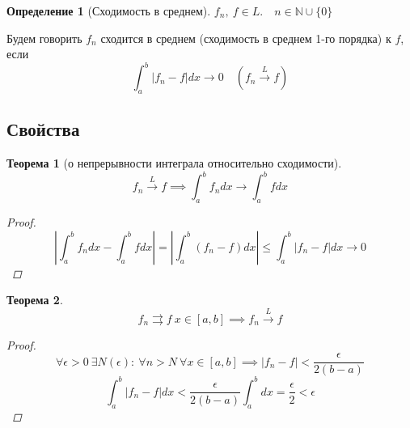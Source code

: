 \documentclass[a4paper]{article}
\newtheorem*{theorem}{Теорема}
\theoremstyle{definition}
\newtheorem*{definition}{Определение}
\theoremstyle{remark}
\begin{document}
\begin{tcolorbox}[title=Сходимость в среднем]
    \begin{definition}[Сходимость в среднем]
        $ f_n, \ f \in L. \quad n \in \mathbb{N} \cup \{ 0 \} $ 

        Будем говорить $ f_n $ сходится в среднем (сходимость в среднем 1-го порядка)
        к $ f $, если
        \[
            \int_{a}^{b} |f_n - f| dx \to 0 \quad (f_n \xrightarrow{L} f)
        \]
    \end{definition}
\end{tcolorbox}

\subsection*{Свойства}

\begin{tcolorbox}[title=Теорема о непрерывности интеграла относительно сходимости]
    \begin{theorem}[о непрерывности интеграла относительно сходимости]
        \[
            f_n \xrightarrow{L} f \implies \int_{a}^{b} f_n dx \to \int_{a}^{b} 
            f dx
        \]

        \begin{proof}
            \[
                \left| \int_{a}^{b} f_n dx - \int_{a}^{b} f dx \right| =
                \left|\int_{a}^{b} (f_n - f) dx \right| \leq \int_{a}^{b} 
                |f_n - f| dx \to 0
            \]
        \end{proof}
    \end{theorem}
\end{tcolorbox}

\begin{tcolorbox}
\begin{theorem}
    \[
        f_n \rightrightarrows f \ x \in [a,b] \implies f_n \xrightarrow{L} f
    \]

    \begin{proof}
        \[
            \forall \epsilon > 0 \ \exists N(\epsilon) : \ \forall n > N \ 
            \forall x \in [a,b] \implies |f_n - f| < \frac{\epsilon}{2(b-a)} 
        \]
        \[
            \int_{a}^{b} |f_n - f| dx < \frac{\epsilon}{2(b-a)}\int_{a}^{b} dx =
            \frac{\epsilon}{2} < \epsilon
        \]
    \end{proof}
\end{theorem}
\end{tcolorbox}
\end{document}
